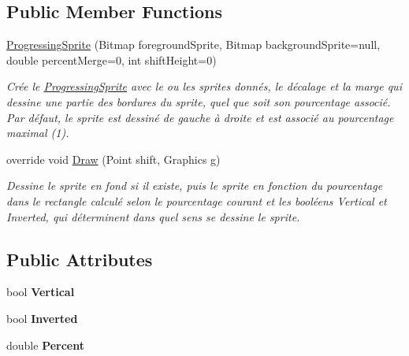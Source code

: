 \subsection*{Public Member Functions}
\begin{DoxyCompactItemize}
\item 
\hyperlink{class_tentacle_slicers_1_1graphics_1_1_progressing_sprite_a3440006da44c22abde8a74d40a2b4d7f}{Progressing\+Sprite} (Bitmap foreground\+Sprite, Bitmap background\+Sprite=null, double percent\+Merge=0, int shift\+Height=0)
\begin{DoxyCompactList}\small\item\em Crée le \hyperlink{class_tentacle_slicers_1_1graphics_1_1_progressing_sprite}{Progressing\+Sprite} avec le ou les sprites donnés, le décalage et la marge qui dessine une partie des bordures du sprite, quel que soit son pourcentage associé. Par défaut, le sprite est dessiné de gauche à droite et est associé au pourcentage maximal (1). \end{DoxyCompactList}\item 
override void \hyperlink{class_tentacle_slicers_1_1graphics_1_1_progressing_sprite_acee169ba719f33614174a7f5e245192d}{Draw} (Point shift, Graphics g)
\begin{DoxyCompactList}\small\item\em Dessine le sprite en fond si il existe, puis le sprite en fonction du pourcentage dans le rectangle calculé selon le pourcentage courant et les booléens Vertical et Inverted, qui déterminent dans quel sens se dessine le sprite. \end{DoxyCompactList}\end{DoxyCompactItemize}
\subsection*{Public Attributes}
\begin{DoxyCompactItemize}
\item 
\mbox{\label{class_tentacle_slicers_1_1graphics_1_1_progressing_sprite_a432c90adb880b2ab290af0f61a805c03}} 
bool {\bfseries Vertical}
\item 
\mbox{\label{class_tentacle_slicers_1_1graphics_1_1_progressing_sprite_a9bfb2789c54f08660c8c21158805c34c}} 
bool {\bfseries Inverted}
\item 
\mbox{\label{class_tentacle_slicers_1_1graphics_1_1_progressing_sprite_a80179de4d529b253feedf5be7ea829d6}} 
double {\bfseries Percent}
\end{DoxyCompactItemize}
